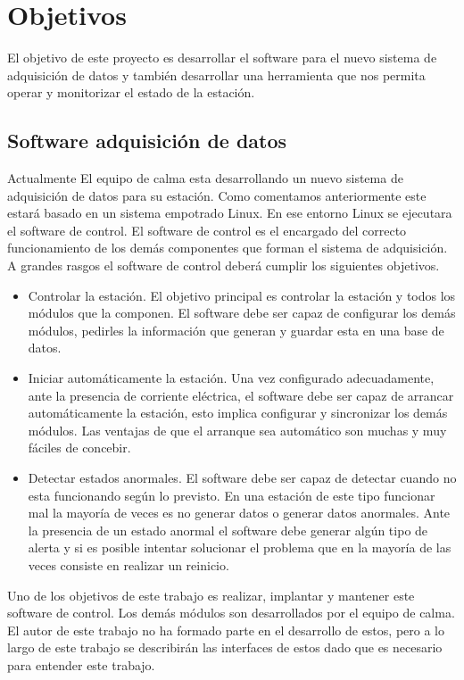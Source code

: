 \section{Objetivos}
	El objetivo de este proyecto es desarrollar el software para el nuevo sistema de adquisición de datos y también desarrollar una herramienta
	que nos permita operar y monitorizar el estado de la estación. 
	\subsection{Software adquisición de datos}
	Actualmente El equipo de \gls{calma} esta desarrollando un nuevo sistema de adquisición de datos para su estación. Como comentamos
		anteriormente este estará basado en un sistema empotrado Linux. En ese entorno Linux se ejecutara el software de control. El software
		de control es el encargado del correcto funcionamiento de los demás componentes que forman el sistema de adquisición. A grandes rasgos
		el software de control deberá cumplir los siguientes objetivos.
		\begin{itemize}
			\item 	Controlar la estación. El objetivo principal es controlar la estación y todos los módulos que la componen. El software
			  	debe ser capaz de configurar los demás módulos, pedirles la información que generan y guardar esta en una base de datos. 
			\item 	Iniciar automáticamente la estación. Una vez configurado adecuadamente, ante la presencia de corriente eléctrica, el
			  	software debe ser capaz de arrancar automáticamente la estación, esto implica configurar y sincronizar los demás
				módulos. Las ventajas de que el arranque sea automático son muchas y muy fáciles de concebir.
			\item 	Detectar estados anormales. El software debe ser capaz de detectar cuando no esta funcionando según lo previsto. En
			  	una estación de este tipo funcionar mal la mayoría de veces es no generar datos o generar datos anormales. Ante la
				presencia de un estado anormal el software debe generar algún tipo de alerta y si es posible intentar solucionar el
				problema que en la mayoría de las veces consiste en realizar un reinicio.
		\end{itemize}
		Uno de los objetivos de este trabajo es realizar, implantar y mantener este software de control. Los demás módulos son desarrollados
		por el equipo de \gls{calma}. El autor de este trabajo no ha formado parte en el desarrollo de estos, pero a lo largo de este trabajo se
		describirán las interfaces de estos dado que es necesario para entender este trabajo. 
